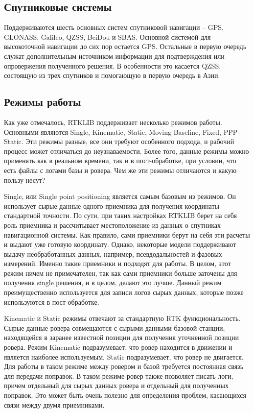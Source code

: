 \subsection{Спутниковые системы} \label{subsect_1_2_1}

Поддерживаются шесть основных систем спутниковой навигации – GPS, GLONASS, Galileo, QZSS, BeiDou и SBAS. Основной системой для высокоточной навигации до сих пор остается GPS. Остальные в первую очередь служат дополнительным источником информации для подтверждения или опровержения полученного решения. В особенности это касается QZSS, состоящую из трех спутников и помогающую в первую очередь в Азии.

\subsection{Режимы работы} \label{subsect_1_2_2}

Как уже отмечалось, RTKLIB поддерживает несколько режимов работы. Основными являются Single, Kinematic, Static, Moving-Baseline, Fixed, PPP-Static. Эти режимы разные, все они требуют особенного подхода, и рабочий процесс может отличаться до неузнаваемости. Более того, данные режимы можно применять как в реальном времени, так и в пост-обработке, при условии, что есть файлы с логами базы и ровера. Чем же эти режимы отличаются и какую пользу несут?

Single, или Single point positioning является самым базовым из режимов. Он использует сырые данные одного приемника для получения координаты стандартной точности. По сути, при таких настройках RTKLIB берет на себя роль приемника и рассчитывает местоположение из данных о спутниках навигационной системы. Как правило, сами приемники берут на себя эти расчеты и выдают уже готовую координату. Однако, некоторые модели поддерживают выдачу необработанных данных, например, псевдодальностей и фазовых измерений. Именно такие приемники и подходят для работы.  В целом, этот режим ничем не примечателен, так как сами приемники больше заточены для получения single решения, и в целом, делают это лучше. Данный режим преимущественно используется для записи логов сырых данных, которые позже используются в пост-обработке.

Kinematic и Static режимы отвечают за стандартную RTK функциональность. Сырые данные ровера совмещаются с сырыми данными базовой станции, находящейся в заранее известной позиции для получения уточненной позиции ровера. Режим Kinematic подразумевает, что ровер находится в движении и является наиболее используемым. Static подразумевает, что ровер не двигается. Для работы в таком режиме между ровером и базой требуется постоянная связь для передачи поправок. В таком режиме ровер также позволяет писать логи, причем отдельный для сырых данных ровера и отдельный для полученных поправок. Это может быть очень полезно для определения проблем, касающихся связи между двумя приемниками.

